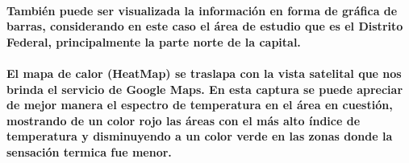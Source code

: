     \paragraph{También puede ser visualizada la información en forma de gráfica de barras, considerando en este caso el área de estudio que es el Distrito Federal, principalmente la parte norte de la capital.}
    \paragraph{El mapa de calor (HeatMap) se traslapa con la vista satelital que nos brinda el servicio de Google Maps. En esta captura se puede apreciar de mejor manera el espectro de temperatura en el área en cuestión, mostrando de un color rojo las áreas con el más alto índice de temperatura y disminuyendo a un color verde en las zonas donde la sensación termica fue menor.}
